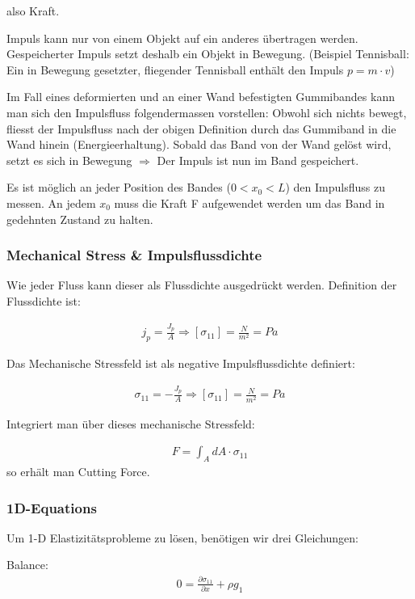 \documentclass[a4paper]{scrartcl}
\begin{document}
also Kraft.

Impuls kann nur von einem Objekt auf ein anderes übertragen werden.
Gespeicherter Impuls setzt deshalb ein Objekt in Bewegung. (Beispiel
Tennisball: Ein in Bewegung gesetzter, fliegender Tennisball enthält den Impuls
$p=m \cdot v$)

Im Fall eines deformierten und an einer Wand befestigten Gummibandes kann man
sich den Impulsfluss folgendermassen vorstellen: Obwohl sich nichts bewegt,
fliesst der Impulsfluss nach der obigen Definition durch das Gummiband in die
Wand hinein (Energieerhaltung). Sobald das Band von der Wand gelöst wird, setzt
es sich in Bewegung $\Rightarrow$ Der Impuls ist nun im Band gespeichert. 

Es ist möglich an jeder Position des Bandes ($0<x_0<L$) den Impulsfluss zu
messen. An jedem $x_0$ muss die Kraft F aufgewendet werden um das Band in
gedehnten Zustand zu halten.

\subsubsection{Mechanical Stress \& Impulsflussdichte}
Wie jeder Fluss kann dieser als Flussdichte ausgedrückt werden. Definition der
Flussdichte ist:


\begin{align}
j_p = \frac{J_p}{A} \Rightarrow [\sigma_{11}]= \frac{N}{m^2} = Pa
\end{align}

Das Mechanische Stressfeld ist als negative Impulsflussdichte definiert:
 
\begin{align}
\sigma_{11}=- \frac{J_p}{A} \Rightarrow [\sigma_{11}]= \frac{N}{m^2} = Pa
\end{align}

Integriert man über dieses mechanische Stressfeld:

\begin{align}
F=\int_A dA \cdot \sigma_{11}
\end{align}
so erhält man \flqq Cutting Force\frqq. 
\subsubsection{1D-Equations}

Um 1-D Elastizitätsprobleme zu lösen, benötigen wir drei Gleichungen:

Balance:
\begin{align}
0=\frac{\partial \sigma_{11}}{\partial x}+\rho g_1
\end{align}
\end{document}
